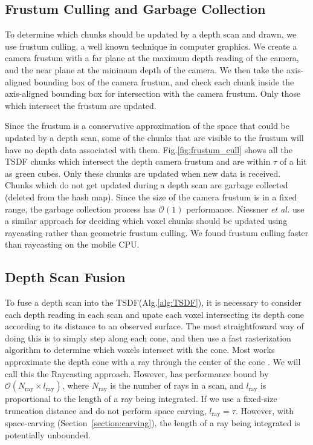 \documentclass[conference]{IEEEtran}
\newcommand{\sref}[1]{Section~\ref{#1}}
\newcommand{\figref}[1]{Fig.\ref{#1}}
\newcommand{\algoref}[1]{Alg.\ref{#1}}
\newcommand{\etal}{\textit{et al.}\xspace}
\newcommand{\TSDF}{TSDF\xspace}
\begin{document}
\subsection{Frustum Culling and Garbage Collection}
\label{section:frustum}
To determine which chunks should be updated by a depth scan and drawn, we use
frustum culling, a well known technique in computer graphics. We  create a
camera frustum with a far plane at the maximum depth reading of the camera, and
the near plane at the minimum depth of the camera. We then take the 
axis-aligned bounding box of the camera frustum, and check each chunk inside the
axis-aligned bounding box for intersection with the camera frustum. Only those
which intersect the frustum are updated.

Since the frustum is a conservative approximation of the space that could be
updated by a depth scan, some of the chunks that are visible to the frustum will
have no depth data associated with them. \figref{fig:frustum_cull} shows all the
\TSDF chunks which intersect the depth camera frustum and are within $\tau$ of
a hit as green cubes. Only these chunks are updated when new data is received. 
Chunks which do not get updated during a depth scan are garbage collected
(deleted from the hash map). Since the size of the camera frustum is in a fixed
range, the garbage collection process has $\mathcal{O}(1)$ performance. Niessner
\etal \cite{NiessnerHashing} use a similar approach for deciding which voxel
chunks should be updated using raycasting rather than geometric frustum
culling. We found frustum culling faster than raycasting on the mobile CPU.

\subsection{Depth Scan Fusion}
\label{section:scan_integration}
To fuse a depth scan into the \TSDF (\algoref{alg:TSDF}), it is necessary
to consider each depth reading in each scan and upate each
voxel intersecting its depth cone according to its distance to an observed
surface. The most straightfoward way of doing this is to simply step along
each cone, and then use a fast rasterization algorithm \cite{RayTracing} to determine which voxels
intersect with the cone. Most works  approximate the depth cone with a ray
through the center of the cone \cite{Newcombe, NiessnerHashing}. We will call
this the Raycasting approach. However, has performance bound by
$\mathcal{O}(N_{\text{ray}} \times l_{\text{ray}})$, where $N_{\text{ray}}$ is
the number of rays in a scan, and $l_{\text{ray}}$  is proportional to the
length of a ray being integrated. If we use a fixed-size truncation distance
and do not perform space carving, $l_{\text{ray}} = \tau$.
However, with space-carving (\sref{section:carving}), the length of a ray
being integrated is potentially unbounded.
\end{document}
